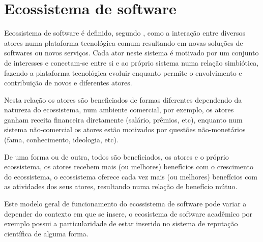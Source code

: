 \section{Ecossistema de software}


Ecossistema de software é definido, segundo ,
como a interação entre diversos atores numa plataforma tecnológica comum
resultando em novas soluções de softwares ou novos serviços. Cada ator neste
sistema é motivado por um conjunto de interesses e conectam-se entre si e ao
próprio sistema numa relação simbiótica, fazendo a plataforma tecnológica
evoluir enquanto permite o envolvimento e contribuição de novos e diferentes
atores.





Nesta relação os atores são beneficiados de formas diferentes dependendo da
natureza do ecossistema, num ambiente comercial, por exemplo, os atores ganham
receita financeira diretamente (salário, prêmios, etc), enquanto num sistema
não-comercial os atores estão motivados por questões não-monetários (fama,
conhecimento, ideologia, etc).

De uma forma ou de outra, todos são beneficiados, os atores e o próprio
ecossistema, os atores recebem mais (ou melhores) benefícios com o crescimento
do ecossistema, o ecossistema oferece cada vez mais (ou melhores) benefícios
com as atividades dos seus atores, resultando numa relação de benefício
mútuo.

Este modelo geral de funcionamento do ecossistema de software pode variar a
depender do contexto em que se insere, o ecosistema de software acadêmico por
exemplo possui a particularidade de estar inserido no sistema de reputação
científica de alguma forma.

%
%
%

